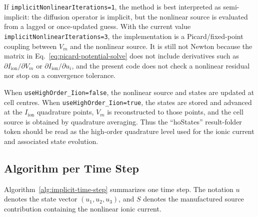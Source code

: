 \documentclass[11pt,a4paper]{article}
\newcommand{\code}[1]{\texttt{#1}}
\begin{document}
If \code{implicitNonlinearIterations=1}, the method is best interpreted as
semi-implicit: the diffusion operator is implicit, but the nonlinear source is
evaluated from a lagged or once-updated guess. With the current value
\code{implicitNonlinearIterations=3}, the implementation is a Picard/fixed-point
coupling between $V_m$ and the nonlinear source. It is still not Newton because
the matrix in Eq.~\eqref{eq:picard-potential-solve} does not include derivatives
such as $\partial I_{\mathrm{ion}}/\partial V_m$ or
$\partial I_{\mathrm{ion}}/\partial u_i$, and the present code does not check a
nonlinear residual nor stop on a convergence tolerance.

When \code{useHighOrder\_Iion=false}, the nonlinear source and states are updated
at cell centres. When \code{useHighOrder\_Iion=true}, the states are stored and
advanced at the $I_{\mathrm{ion}}$ quadrature points, $V_m$ is reconstructed to
those points, and the cell source is obtained by quadrature averaging. Thus the
``hoStates'' result-folder token should be read as the high-order quadrature
level used for the ionic current and associated state evolution.

\subsection{Algorithm per Time Step}
Algorithm~\ref{alg:implicit-time-step} summarizes one time step. The notation
$u$ denotes the state vector $(u_1,u_2,u_3)$, and $S$ denotes the manufactured
source contribution containing the nonlinear ionic current.
\end{document}
